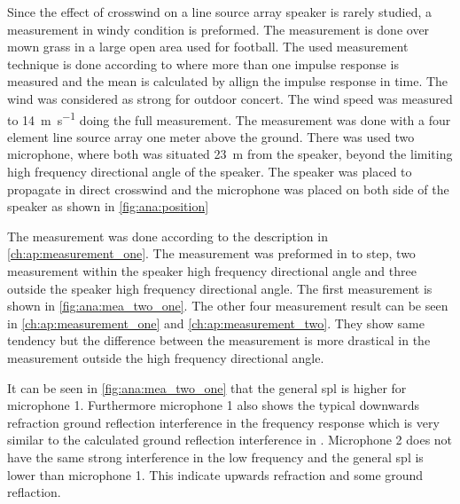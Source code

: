 Since the effect of crosswind on a line source array speaker is rarely studied, a measurement in windy condition is preformed. The measurement is done over mown grass in a large open area used for football. The used measurement technique is done according to \citep{gunness2001loudspeaker} where more than one impulse response is measured and the mean is calculated by allign the impulse response in time. The wind was considered as strong for outdoor concert. The wind speed was measured to  \SI{14}{\meter\per\second} doing the full measurement. The measurement was done with a four element line source array one meter above the ground. There was used two microphone, where both was situated \SI{23}{\meter} from the speaker, beyond the limiting high frequency directional angle of the speaker. The speaker was placed to propagate in direct crosswind and the microphone was placed on both side of the speaker as shown in \autoref{fig:ana:position}



The measurement was done according to the description in \autoref{ch:ap:measurement_one}. The measurement was preformed in to step, two measurement within the speaker high frequency directional angle and three outside the speaker high frequency directional angle. The first measurement is shown in \autoref{fig:ana:mea_two_one}. The other four measurement result can be seen in \autoref{ch:ap:measurement_one} and \autoref{ch:ap:measurement_two}. They show same tendency but the difference between the measurement is more drastical in the measurement outside the high frequency directional angle. 



It can be seen in \autoref{fig:ana:mea_two_one} that the general \gls{spl} is higher for microphone 1. Furthermore microphone 1 also shows the typical downwards refraction ground reflection interference in the frequency response which is very similar to the calculated ground reflection interference in \citep{review_of_sound}.  Microphone 2 does not have the same strong interference in the low frequency and the general \gls{spl} is lower than microphone 1. This indicate upwards refraction and some ground reflaction. 



